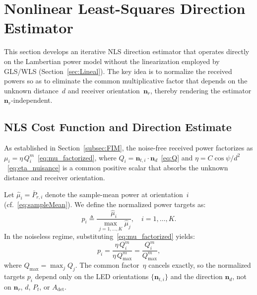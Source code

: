 \documentclass[journal]{IEEEtran}
\begin{document}
\section{Nonlinear Least-Squares Direction Estimator}
\label{sec:NoLineal}


This section develops an iterative NLS direction estimator that operates directly on the Lambertian power model without the linearization employed by GLS/WLS (Section~\ref{sec:Lineal}). The key idea is to normalize the received powers so as to eliminate the common multiplicative factor that depends on the unknown distance~$d$ and receiver orientation~$\mathbf{n}_r$, thereby rendering the estimator $\mathbf{n}_r$-independent.

\subsection{NLS Cost Function and Direction Estimate}
As established in Section~\ref{subsec:FIM}, the noise-free received power factorizes as $\mu_i = \eta\,Q_i^m$~\eqref{eq:mu_factorized}, where $Q_i = \mathbf{n}_{t,i}\cdot\mathbf{n}_d$~\eqref{eq:Q} and $\eta = C\cos\psi/d^2$~\eqref{eq:eta_nuisance} is a common positive scalar that absorbs the unknown distance and receiver orientation.

Let $\hat\mu_i = \bar P_{r,i}$ denote the sample-mean power at orientation~$i$ (cf.~\eqref{eq:sampleMean}). We define the normalized power targets as:
\begin{equation}
p_i \triangleq \frac{\hat\mu_i}{\max_{j=1,\ldots,K}\hat\mu_j}, \quad i=1,\ldots,K.
\label{eq:p_target}
\end{equation}
In the noiseless regime, substituting~\eqref{eq:mu_factorized} yields:
\begin{equation}
p_i = \frac{\eta\,Q_i^m}{\eta\,Q_{\max}^m} = \frac{Q_i^m}{Q_{\max}^m},
\label{eq:p_target_noiseless}
\end{equation}
where $Q_{\max}=\max_j Q_j$. The common factor~$\eta$ cancels exactly, so the normalized targets $p_i$ depend only on the LED orientations $\{\mathbf{n}_{t,i}\}$ and the direction $\mathbf{n}_d$, not on $\mathbf{n}_r$, $d$, $P_t$, or $A_{\mathrm{det}}$.
\end{document}
